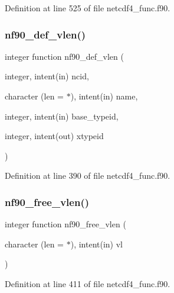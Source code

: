 Definition at line 525 of file netcdf4\+\_\+func.\+f90.

\mbox{\label{netcdf4__func_8f90_a1ae0ad08b63c955cc37919e3cf9a949e}} 
\subsubsection{\texorpdfstring{nf90\+\_\+def\+\_\+vlen()}{nf90\_def\_vlen()}}
{\footnotesize\ttfamily integer function nf90\+\_\+def\+\_\+vlen (\begin{DoxyParamCaption}\item[{integer, intent(in)}]{ncid,  }\item[{character (len = $\ast$), intent(in)}]{name,  }\item[{integer, intent(in)}]{base\+\_\+typeid,  }\item[{integer, intent(out)}]{xtypeid }\end{DoxyParamCaption})}



Definition at line 390 of file netcdf4\+\_\+func.\+f90.

\mbox{\label{netcdf4__func_8f90_a5b9af10ec3301e9e889799d15b9576b9}} 
\subsubsection{\texorpdfstring{nf90\+\_\+free\+\_\+vlen()}{nf90\_free\_vlen()}}
{\footnotesize\ttfamily integer function nf90\+\_\+free\+\_\+vlen (\begin{DoxyParamCaption}\item[{character (len = $\ast$), intent(in)}]{vl }\end{DoxyParamCaption})}



Definition at line 411 of file netcdf4\+\_\+func.\+f90.

\mbox{\label{netcdf4__func_8f90_ae8288b57cec7fb2533224afc4ba0f890}} 
